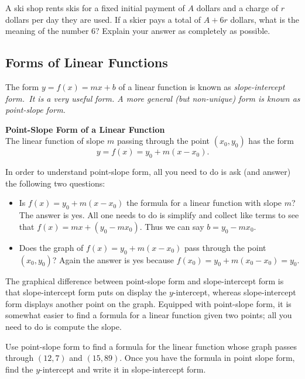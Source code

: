 \begin{question} A ski shop rents skis for a fixed initial payment of $A$ dollars and a charge of $r$ dollars per day they are used. If a skier pays a total of $A + 6r$ dollars, what is the meaning of the number $6$? Explain your answer as completely as possible.
\end{question}
       
\subsection{Forms of Linear Functions}

The form $y = f(x) = mx + b$ of a linear function is known as \it{slope-intercept form.\ }\normalfont It is a very useful form. A more general (but non-unique) form is known as \it{point-slope form.}\normalfont\\

\begin{tcolorbox}
{\bf Point-Slope Form of a Linear Function}\\
The linear function of slope $m$ passing through the point $(x_0,y_0)$ has the form 
\[
y = f(x) = y_0 + m(x-x_0).
\]
\end{tcolorbox}

In order to understand point-slope form, all you need to do is ask (and answer) the following two questions:
\begin{itemize}
\item Is $f(x) = y_0 + m(x-x_0)$ the formula for a linear function with slope $m$? The answer is yes. All one needs to do is simplify and collect like terms to see that $f(x) = mx + (y_0 - mx_0)$. Thus we can say $b = y_0 - mx_0$.
\item Does the graph of $f(x) = y_0 + m(x-x_0)$ pass through the point $(x_0,y_0)$? Again the answer is yes because $f(x_0) = y_0 + m(x_0-x_0) = y_0$.
\end{itemize}
The graphical difference between point-slope form and slope-intercept form is that slope-intercept form puts on display the $y$-intercept, whereas slope-intercept form displays another point on the graph. Equipped with point-slope form, it is somewhat easier to find a formula for a linear function given two points; all you need to do is compute the slope.

\par 

\begin{question} Use point-slope form to find a formula for the linear function whose graph passes through $(12,7)$ and $(15,89)$. Once you have the formula in point slope form, find the $y$-intercept and write it in slope-intercept form.  
\end{question}

